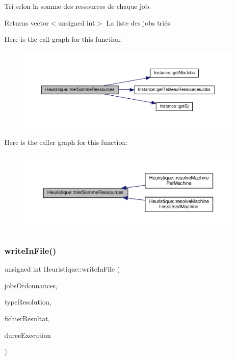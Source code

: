Tri selon la somme des ressources de chaque job. 

\begin{DoxyReturn}{Returns}
vector$<$unsigned int$>$ La liste des jobs triés 
\end{DoxyReturn}
Here is the call graph for this function\+:\nopagebreak
\begin{figure}[H]
\begin{center}
\leavevmode
\includegraphics[width=350pt]{classHeuristique_a6101d6d238a7667b820b50629e4d497f_cgraph}
\end{center}
\end{figure}
Here is the caller graph for this function\+:\nopagebreak
\begin{figure}[H]
\begin{center}
\leavevmode
\includegraphics[width=350pt]{classHeuristique_a6101d6d238a7667b820b50629e4d497f_icgraph}
\end{center}
\end{figure}
\mbox{\label{classHeuristique_a2aa8150a74e4b2b903cddacb22a2396b}} 
\subsubsection{\texorpdfstring{write\+In\+File()}{writeInFile()}}
{\footnotesize\ttfamily unsigned int Heuristique\+::write\+In\+File (\begin{DoxyParamCaption}\item[{vector$<$ vector$<$ unsigned int $>$$>$}]{jobs\+Ordonnances,  }\item[{Q\+String}]{type\+Resolution,  }\item[{Q\+String}]{fichier\+Resultat,  }\item[{double}]{duree\+Execution }\end{DoxyParamCaption})}



